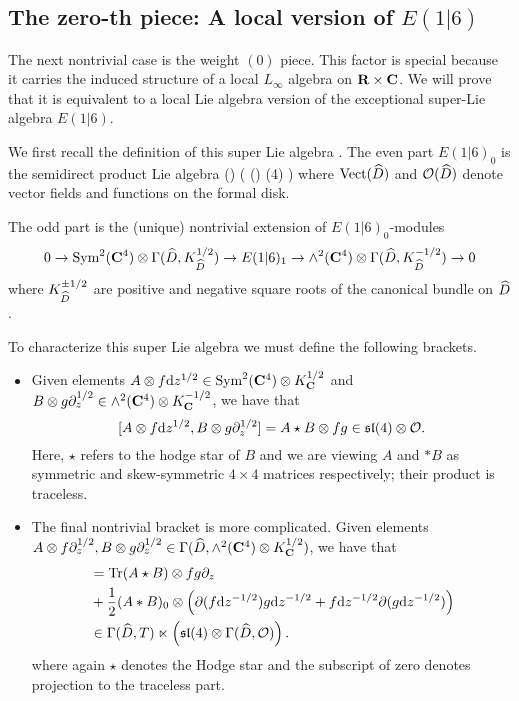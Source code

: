 \documentclass[../main.tex]{subfiles}
\begin{document}



\subsection{The zero-th piece: A local version of $E(1|6)$}
\parsec[] The next nontrivial case is the weight ${(0)}$ piece. This factor is special because it carries the induced structure of a local $L_\infty$ algebra on $\mathbf{R}\times \mathbf{C}$. We will prove that it is equivalent to a local Lie algebra version of the exceptional super-Lie algebra $E(1|6)$. 

We first recall the definition of this super Lie algebra \cite{KacBible}. 
The even part $E(1|6)_0$ is the semidirect product Lie algebra 
\beqn
\Vect() \ltimes \left( \cO() \otimes {}(4) \right )
\eeqn
where $\Vect(\Hat{D})$ and $\cO(\Hat{D})$ denote vector fields and functions on the formal disk.

The odd part is the (unique) nontrivial extension of $E(1|6)_0$-modules 
\[0\to \Sym^2 (\C^4)\otimes \Gamma(\Hat{D}, K^{1/2}_{\Hat{D}}) \to E(1|6)_1 \to \wedge^2 (\C^4) \otimes \Gamma(\Hat{D}, K^{-1/2}_{\Hat{D}}) \to 0 
\]
where $K^{\pm 1/2}_{\Hat{D}}$ are positive and negative square roots of the canonical bundle on $\Hat{D}$.

To characterize this super Lie algebra we must define the following brackets.
\begin{itemize}
\item Given elements $A \otimes f \mathrm{d} z^{1/2}\in \text{Sym}^2 (\mathbf{C}^4)\otimes K^{1/2}_{\mathbf{C}}$ and $B\otimes g \partial_z^{1/2}\in \wedge^2 (\mathbf{C}^4)\otimes K^{-1/2}_{\mathbf{C}}$, we have that
\[
[A \otimes f \mathrm{d} z^{1/2}, B\otimes g \partial_z^{1/2}] = A \star B \otimes fg \in \mathfrak{sl}(4)\otimes \mathcal{O}.
\]
Here, $\star$ refers to the hodge star of $B$ and we are viewing $A$ and $*B$ as symmetric and skew-symmetric $4\times 4$ matrices respectively; their product is traceless. 

\item The final nontrivial bracket is more complicated. 
Given elements $A \otimes f \partial_z^{1/2}, B\otimes g \partial_z^{1/2} \in \Gamma( \widehat D, \wedge^2 (\mathbf{C}^4) \otimes K^{1/2}_{\mathbf{C}})$, we have that 
\begin{align*}
[A\otimes f \d z^{-1/2} , B \otimes g \d z^{-1/2} ] & = \tr (A \star B) \otimes fg \del_z \\ & + \frac12 (A*B)_0 \otimes \left (\del (f \d z^{-1/2} ) g \d z^{-1/2} + f \d z^{-1/2} \del (g \d z^{-1/2} ) \right ) \\
& \in \Gamma (\hat D, T) \ltimes \left (\mf {sl}(4) \otimes \Gamma (\hat D, \mc O) \right ) .
\end{align*}
where again $\star$ denotes the Hodge star and the subscript of zero denotes projection to the traceless part. 
\end{itemize}
\end{document}
